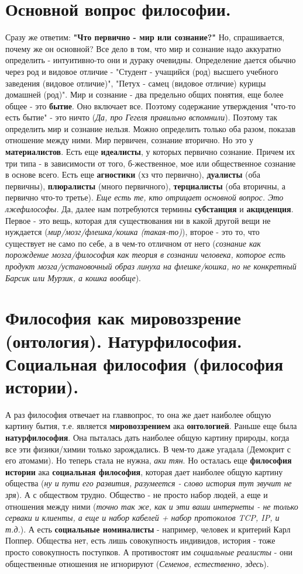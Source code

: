 \section{ Основной вопрос философии.}
Сразу же ответим: \textbf{"Что первично - мир или сознание?"} Но, спрашивается, почему же он основной? Все дело в том, что мир и сознание надо аккуратно определить - интуитивно-то они и дураку очевидны. Определение дается обычно через род и видовое отличие - "Студент - учащийся (род) высшего учебного заведения (видовое отличие)", "Петух - самец (видовое отличие) курицы домашней (род)". Мир и сознание - два предельно общих понятия, еще более общее - это \textbf{бытие}. Оно включает все. Поэтому содержание утверждения "что-то есть бытие" - это ничто (\textit{Да, про Гегеля правильно вспомнили}). Поэтому так определить мир и сознание нельзя. Можно определить только оба разом, показав отношение между ними. Мир первичен, сознание вторично. Но это у \textbf{материалистов}. Есть еще \textbf{идеалисты}, у которых первично сознание. Причем их три типа - в зависимости от того, б-жественное, мое или общественное сознание в основе всего. Есть еще \textbf{агностики} (хз что первично), \textbf{дуалисты} (оба первичны), \textbf{плюралисты} (много первичного), \textbf{терциалисты} (оба вторичны, а первично что-то третье). \textit{Еще есть те, кто отрицает основной вопрос. Это лжефилософы.} Да, далее нам потребуются термины \textbf{субстанция} и \textbf{акциденция}. Первое - это вещь, которая для существования ни в какой другой вещи не нуждается (\textit{мир/мозг/флешка/кошка (такая-то)}), второе - это то, что существует не само по себе, а в чем-то отличном от него (\textit{сознание как порождение мозга/философия как теория в сознании человека, которое есть продукт мозга/установочный образ линуха на флешке/кошка, но не конкретный Барсик или Мурзик, а кошка вообще}).

\section{ Философия как мировоззрение (онтология). Натурфилософия. Социальная философия (философия истории).}
А раз философия отвечает на главвопрос, то она же дает наиболее общую картину бытия, т.е. является \textbf{мировоззрением} ака \textbf{онтологией}. Раньше еще была \textbf{натурфилософия}. Она пыталась дать наиболее общую картину природы, когда все эти физики/химии только зарождались. В чем-то даже угадала (Демокрит с его атомами). Но теперь стала не нужна, \textit{аки тян}. Но осталась еще \textbf{философия истории} ака \textbf{социальная философия}, которая дает наиболее общую картину общества (\textit{ну и пути его развития, разумеется - слово история тут звучит не зря}). А с обществом трудно. Общество - не просто набор людей, а еще и отношения между ними (\textit{точно так же, как и эти ваши интернеты - не только серваки и клиенты, а еще и набор кабелей + набор протоколов TCP, IP, и т.д.}). А есть \textbf{социальные номиналисты} - например, человек и критерий Карл Поппер. Общества нет, есть лишь совокупность индивидов, история - тоже просто совокупность поступков. А противостоят им \textit{социальные реалисты} - они общественные отношения не игнорируют (\textit{Семенов, естественно, здесь}).

